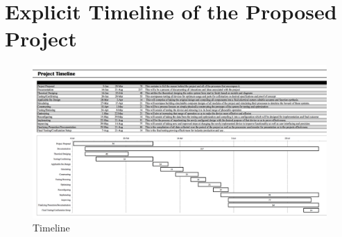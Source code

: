 \documentclass[12pt]{report}
\begin{document}
\chapter[Timeline]{Explicit Timeline of the Proposed Project}
\begin{figure}[h!]
	\centering
	\includegraphics[width=\textwidth]{timeline.png}
	\caption{Timeline}
	\label{fig:timeline}
\end{figure}
 
\end{document}
